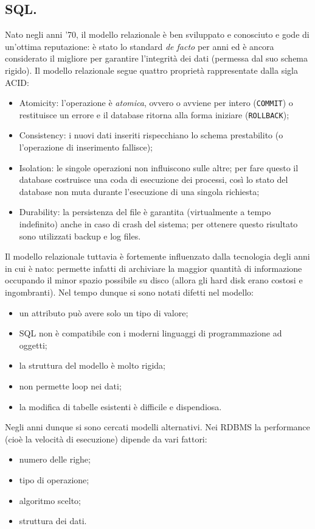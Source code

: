 \documentclass[a4page, 11pt]{article}
\begin{document}
\subsection{SQL.}
Nato negli anni '70, il modello relazionale è ben sviluppato e conosciuto e gode di un'ottima reputazione: è stato lo standard \textit{de facto} per anni ed è ancora considerato il migliore per garantire l'integrità dei dati (permessa dal suo schema rigido).
Il modello relazionale segue quattro proprietà rappresentate dalla sigla ACID:
\begin{itemize}
\item Atomicity: l'operazione è \textit{atomica}, ovvero o avviene per intero (\texttt{COMMIT}) o restituisce un errore e il database ritorna alla forma iniziare (\texttt{ROLLBACK});
\item Consistency: i nuovi dati inseriti rispecchiano lo schema prestabilito (o l'operazione di inserimento fallisce);
\item Isolation: le singole operazioni non influiscono sulle altre; per fare questo il database costruisce una coda di esecuzione dei processi, così lo stato del database non muta durante l'esecuzione di una singola richiesta;
\item Durability: la persistenza del file è garantita (virtualmente a tempo indefinito) anche in caso di crash del sistema; per ottenere questo risultato sono utilizzati backup e log files.
\end{itemize}

Il modello relazionale tuttavia è fortemente influenzato dalla tecnologia degli anni in cui è nato: permette infatti di archiviare la maggior quantità di informazione occupando il minor spazio possibile su disco (allora gli hard disk erano costosi e ingombranti).
Nel tempo dunque si sono notati difetti nel modello:
\begin{itemize}[noitemsep]
\item un attributo può avere solo un tipo di valore;
\item SQL non è compatibile con i moderni linguaggi di programmazione ad oggetti;
\item la struttura del modello è molto rigida;
\item non permette loop nei dati;
\item la modifica di tabelle esistenti è difficile e dispendiosa.
\end{itemize}

Negli anni dunque si sono cercati modelli alternativi.
Nei RDBMS la performance (cioè la velocità di esecuzione) dipende da vari fattori:
\begin{itemize}
\item numero delle righe;
\item tipo di operazione;
\item algoritmo scelto;
\item struttura dei dati.
\end{itemize}
\end{document}
